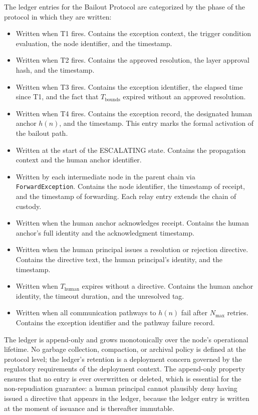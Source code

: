 The ledger entries for the Bailout Protocol are categorized by the phase of the protocol in which they are written:

\begin{itemize}\itemsep=0pt
  \item[\texttt{BOUNDED\_ENTERED}:] Written when T1 fires. Contains the exception context, the trigger condition evaluation, the node identifier, and the timestamp.
  \item[\texttt{BOUNDED\_EXIT\_RESOLVED}:] Written when T2 fires. Contains the approved resolution, the \fact{} layer approval hash, and the timestamp.
  \item[\texttt{BOUNDED\_EXIT\_TIMEOUT}:] Written when T3 fires. Contains the exception identifier, the elapsed time since T1, and the fact that $T_{\text{bounds}}$ expired without an approved resolution.
  \item[\texttt{BAILOUT\_ACTIVATED}:] Written when T4 fires. Contains the exception record, the designated human anchor $h(n)$, and the timestamp. This entry marks the formal activation of the bailout path.
  \item[\texttt{BAILOUT\_ESCALATING}:] Written at the start of the ESCALATING state. Contains the propagation context and the human anchor identifier.
  \item[\texttt{BAILOUT\_RELAY}:] Written by each intermediate node in the parent chain via \texttt{ForwardException}. Contains the node identifier, the timestamp of receipt, and the timestamp of forwarding. Each relay entry extends the chain of custody.
  \item[\texttt{HUMAN\_ACKNOWLEDGED}:] Written when the human anchor acknowledges receipt. Contains the human anchor's full identity and the acknowledgment timestamp.
  \item[\texttt{DIRECTIVE\_ISSUED}:] Written when the human principal issues a resolution or rejection directive. Contains the directive text, the human principal's identity, and the timestamp.
  \item[\texttt{TIMEOUT\_UNRESOLVED}:] Written when $T_{\text{human}}$ expires without a directive. Contains the human anchor identity, the timeout duration, and the unresolved tag.
  \item[\texttt{PATHWAY\_EXHAUSTED}:] Written when all communication pathways to $h(n)$ fail after $N_{\max}$ retries. Contains the exception identifier and the pathway failure record.
\end{itemize}

The ledger is append-only and grows monotonically over the node's operational lifetime. No garbage collection, compaction, or archival policy is defined at the protocol level; the ledger's retention is a deployment concern governed by the regulatory requirements of the deployment context. The append-only property ensures that no entry is ever overwritten or deleted, which is essential for the non-repudiation guarantee: a human principal cannot plausibly deny having issued a directive that appears in the ledger, because the ledger entry is written at the moment of issuance and is thereafter immutable.

